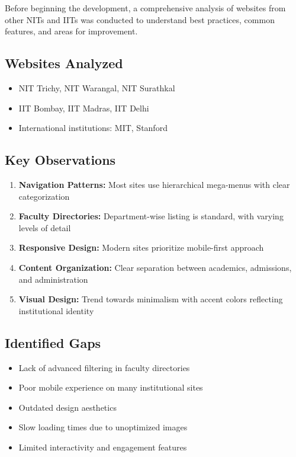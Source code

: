 \documentclass[12pt,a4paper]{report}
\begin{document}
Before beginning the development, a comprehensive analysis of websites from other NITs and IITs was conducted to understand best practices, common features, and areas for improvement.

\subsection*{Websites Analyzed}
\begin{itemize}
    \item NIT Trichy, NIT Warangal, NIT Surathkal
    \item IIT Bombay, IIT Madras, IIT Delhi
    \item International institutions: MIT, Stanford
\end{itemize}

\subsection*{Key Observations}
\begin{enumerate}
    \item \textbf{Navigation Patterns:} Most sites use hierarchical mega-menus with clear categorization
    \item \textbf{Faculty Directories:} Department-wise listing is standard, with varying levels of detail
    \item \textbf{Responsive Design:} Modern sites prioritize mobile-first approach
    \item \textbf{Content Organization:} Clear separation between academics, admissions, and administration
    \item \textbf{Visual Design:} Trend towards minimalism with accent colors reflecting institutional identity
\end{enumerate}

\subsection*{Identified Gaps}
\begin{itemize}
    \item Lack of advanced filtering in faculty directories
    \item Poor mobile experience on many institutional sites
    \item Outdated design aesthetics
    \item Slow loading times due to unoptimized images
    \item Limited interactivity and engagement features
\end{itemize}
\end{document}
